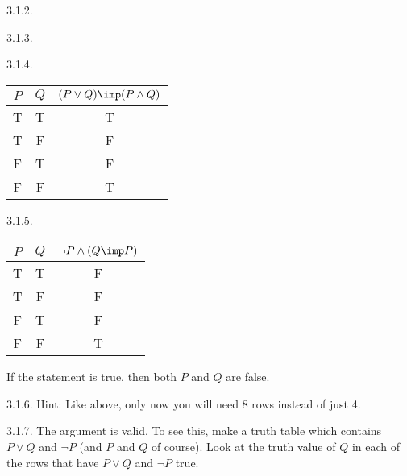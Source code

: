 \begin {itemize}
\begin{ans}{3.1.2.}
\end{ans}
\begin{ans}{3.1.3.}
  
\end{ans}
\begin{ans}{3.1.4.}
 \begin{tabular}{c|c|c}
             $P$ & $Q$ & $(P \vee Q) \imp (P \wedge Q)$\\ \hline
             T & T & T \\
             T & F & F \\
             F & T & F \\
             F & F & T
          \end{tabular}
\end{ans}
\begin{ans}{3.1.5.}
      \begin{tabular}{c|c|c}
             $P$ & $Q$ & $\neg P \wedge (Q \imp P)$\\ \hline
             T & T & F \\
             T & F & F \\
             F & T & F \\
             F & F & T
          \end{tabular}
	If the statement is true, then both $P$ and $Q$ are false.
    
\end{ans}
\begin{ans}{3.1.6.}
    Hint: Like above, only now you will need 8 rows instead of just 4.
  
\end{ans}
\begin{ans}{3.1.7.}
    The argument is valid.  To see this, make a truth table which contains $P \vee Q$ and $\neg P$ (and $P$ and $Q$ of course).  Look at the truth value of $Q$ in each of the rows that have $P \vee Q$ and $\neg P$ true.
  

\end{ans}
\end{itemize}
